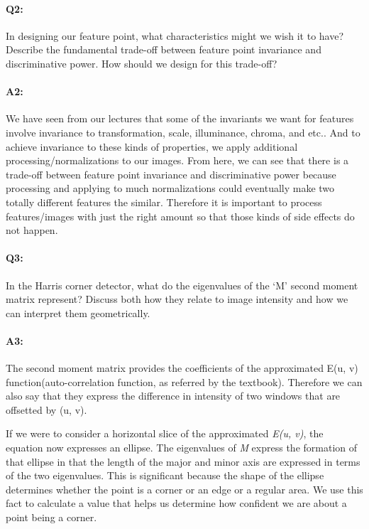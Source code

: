 
\pagebreak
\paragraph{Q2:} In designing our feature point, what characteristics might we wish it to have? Describe the fundamental trade-off between feature point invariance and discriminative power. How should we design for this trade-off?

\paragraph{A2:}
We have seen from our lectures that some of the invariants we want for features involve invariance to transformation, scale, illuminance, chroma, and etc.. And to achieve invariance to these kinds of properties, we apply additional processing/normalizations to our images. From here, we can see that there is a trade-off between feature point invariance and discriminative power because processing and applying to much normalizations could eventually make two totally different features the similar. Therefore it is important to process features/images with just the right amount so that those kinds of side effects do not happen.


\pagebreak
\paragraph{Q3:} In the Harris corner detector, what do the eigenvalues of the `M' second moment matrix represent? Discuss both how they relate to image intensity and how we can interpret them geometrically.

\paragraph{A3:}
The second moment matrix provides the coefficients of the approximated E(u, v) function(auto-correlation function, as referred by the textbook). Therefore we can also say that they express the difference in intensity of two windows that are offsetted by (u, v).

If we were to consider a horizontal slice of the approximated \emph{E(u, v)}, the equation now expresses an ellipse. The eigenvalues of \emph{M} express the formation of that ellipse in that the length of the major and minor axis are expressed in terms of the two eigenvalues. This is significant because the shape of the ellipse determines whether the point is a corner or an edge or a regular area. We use this fact to calculate a value that helps us determine how confident we are about a point being a corner.

